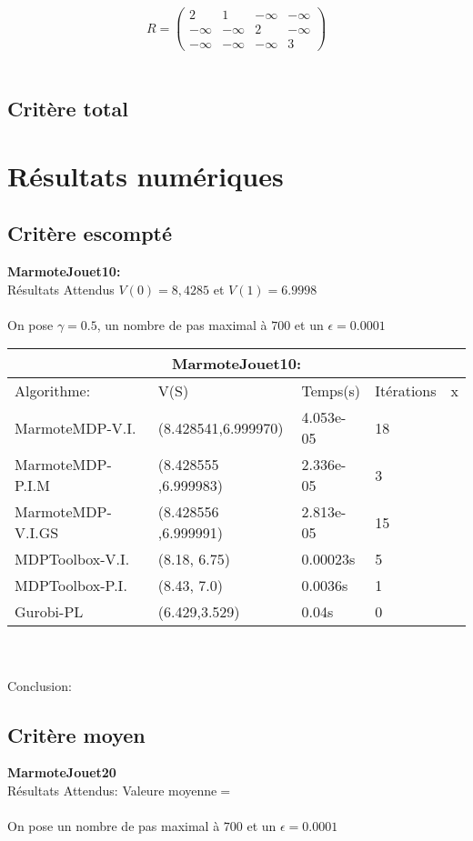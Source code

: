\documentclass{article}
\begin{document}
 $$ R =\begin{pmatrix}
2 & 1 & -\infty & -\infty\\
-\infty & -\infty & 2 & -\infty\\
-\infty & -\infty & -\infty & 3
\end{pmatrix}$$ \\


\subsection{Critère total}

\section{Résultats numériques}
\subsection{Critère escompté}
\textbf{MarmoteJouet10:}\\
Résultats Attendus  $V(0) = 8, 4285 $ et $V (1) = 6.9998 $\\\\
On pose $\gamma = 0.5 $, un nombre de pas maximal à $700$ et un $ \epsilon = 0.0001$ \\

\begin{tabular}{ |p{3.5cm}||p{3.5cm}|p{2cm}|p{2cm}|p{1cm}|  }
 \hline
 \multicolumn{5}{|c|}{\textbf{MarmoteJouet10:}} \\
 \hline
   Algorithme: & V(S) & Temps(s) & Itérations & x\\
 \hline
 MarmoteMDP-V.I. & (8.428541,6.999970) & 4.053e-05 &  18 & \\
 MarmoteMDP-P.I.M & (8.428555 ,6.999983) & 2.336e-05  & 3 & \\
 MarmoteMDP-V.I.GS & (8.428556  ,6.999991) & 2.813e-05  & 15 & \\
 MDPToolbox-V.I. & (8.18, 6.75) & 0.00023s & 5 & \\
 MDPToolbox-P.I. & (8.43, 7.0) & 0.0036s & 1 & \\
 Gurobi-PL & (6.429,3.529) & 0.04s & 0 & \\
 \hline
\end{tabular}\\\\

Conclusion: 

\subsection{Critère moyen}
\textbf{MarmoteJouet20}\\
Résultats Attendus:  Valeure moyenne$ =  $ \\\\
On pose un nombre de pas maximal à $700$ et un $ \epsilon = 0.0001$ \\
\end{document}
